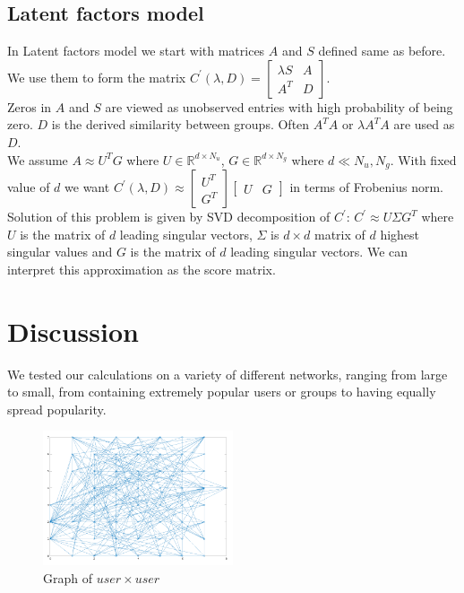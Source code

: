 \documentclass[twoside,twocolumn]{article}
\begin{document}
\subsection{Latent factors model}

In Latent factors model we start with matrices $A$ and $S$ defined same as before. We use them to form the matrix
$ C^\prime (\lambda, D) = \begin{bmatrix} \lambda S & A\\ A^T & D \end{bmatrix} $. \\
Zeros in $A$ and $S$ are viewed as unobserved entries with high probability of being zero. $D$ is the derived similarity between groups. Often $A^TA$ or $\lambda A^TA$ are used as $D$. \\
We assume $A \approx U^T G$ where $U \in \mathbb{R}^{d \times N_u}$, $G \in \mathbb{R}^{d \times N_g}$ where $d \ll N_u, N_g$. With fixed value of $d$ we want $C^\prime (\lambda, D) \approx \begin{bmatrix} U^T\\ G^T \end{bmatrix}\begin{bmatrix}U&G \end{bmatrix}$ in terms of Frobenius norm. \\
Solution of this problem is given by SVD decomposition of $C^\prime$: $C^\prime \approx U \Sigma G^T$ where $U$ is the matrix of $d$ leading singular vectors, $\Sigma$ is $d \times d$ matrix of $d$ highest singular values and $G$ is the matrix of $d$ leading singular vectors. We can interpret this approximation as the score matrix.


\section{Discussion}

We tested our calculations on a variety of different networks, ranging from large to small, from containing extremely popular users or groups to having equally spread popularity.


\begin{figure}[h]
	\centering
	\includegraphics[width=0.5\textwidth]{users_graph}
	\caption{Graph of $user \times user$}
	\label{pic1}
\end{figure}
\end{document}
